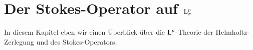 \chapter{Der Stokes-Operator auf \texorpdfstring{$\mathrm{L}_\sigma^p$}{Lsigma\textasciicircum p}}

In diesem Kapitel eben wir einen Überblick über die $\mathrm{L}^p$-Theorie der Helmholtz-Zerlegung und des Stokes-Operators.
